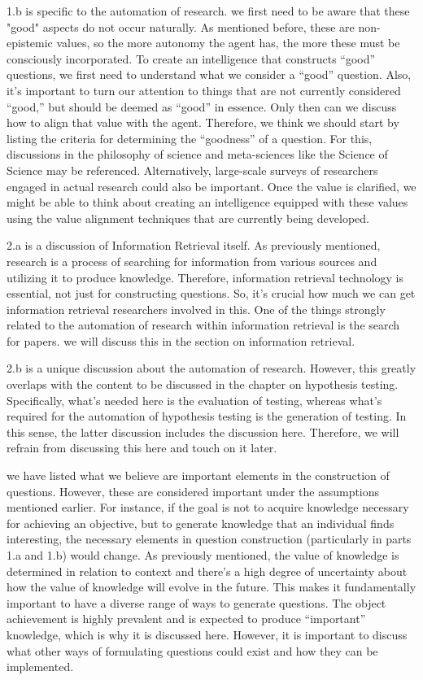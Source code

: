 \documentclass{book}
\begin{document}
1.b is specific to the automation of research. we first need to be aware that these "good" aspects do not occur naturally. As mentioned before, these are non-epistemic values, so the more autonomy the agent has, the more these must be consciously incorporated. To create an intelligence that constructs ``good'' questions, we first need to understand what we consider a ``good'' question. Also, it's important to turn our attention to things that are not currently considered ``good,'' but should be deemed as ``good'' in essence. Only then can we discuss how to align that value with the agent. Therefore, we think we should start by listing the criteria for determining the ``goodness'' of a question. For this, discussions in the philosophy of science and meta-sciences like the Science of Science may be referenced. Alternatively, large-scale surveys of researchers engaged in actual research could also be important. Once the value is clarified, we might be able to think about creating an intelligence equipped with these values using the value alignment techniques that are currently being developed.

2.a is a discussion of Information Retrieval itself. As previously mentioned, research is a process of searching for information from various sources and utilizing it to produce knowledge. Therefore, information retrieval technology is essential, not just for constructing questions. So, it's crucial how much we can get information retrieval researchers involved in this. One of the things strongly related to the automation of research within information retrieval is the search for papers. we will discuss this in the section on information retrieval.

2.b is a unique discussion about the automation of research. However, this greatly overlaps with the content to be discussed in the chapter on hypothesis testing. Specifically, what's needed here is the evaluation of testing, whereas what's required for the automation of hypothesis testing is the generation of testing. In this sense, the latter discussion includes the discussion here. Therefore, we will refrain from discussing this here and touch on it later.

we have listed what we believe are important elements in the construction of questions. However, these are considered important under the assumptions mentioned earlier. For instance, if the goal is not to acquire knowledge necessary for achieving an objective, but to generate knowledge that an individual finds interesting, the necessary elements in question construction (particularly in parts 1.a and 1.b) would change. As previously mentioned, the value of knowledge is determined in relation to context and there's a high degree of uncertainty about how the value of knowledge will evolve in the future. This makes it fundamentally important to have a diverse range of ways to generate questions. The object achievement is highly prevalent and is expected to produce ``important'' knowledge, which is why it is discussed here. However, it is important to discuss what other ways of formulating questions could exist and how they can be implemented.
\end{document}
